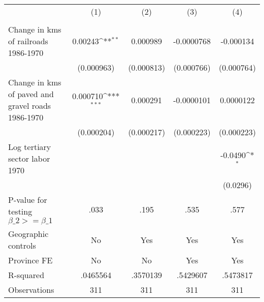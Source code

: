 {
\def\sym#1{\ifmmode^{#1}\else\(^{#1}\)\fi}
\begin{tabular}{l*{4}{c}}
\hline\hline
                &\multicolumn{1}{c}{(1)}&\multicolumn{1}{c}{(2)}&\multicolumn{1}{c}{(3)}&\multicolumn{1}{c}{(4)}\\
                &\multicolumn{1}{c}{}&\multicolumn{1}{c}{}&\multicolumn{1}{c}{}&\multicolumn{1}{c}{}\\
\hline
Change in kms of railroads 1986-1970&  0.00243\sym{**} & 0.000989         &-0.0000768         &-0.000134         \\
                &(0.000963)         &(0.000813)         &(0.000766)         &(0.000764)         \\
[1em]
Change in kms of paved and gravel roads 1986-1970& 0.000710\sym{***}& 0.000291         &-0.0000101         &0.0000122         \\
                &(0.000204)         &(0.000217)         &(0.000223)         &(0.000223)         \\
[1em]
Log tertiary sector labor 1970&                  &                  &                  &  -0.0490\sym{*}  \\
                &                  &                  &                  & (0.0296)         \\
\hline
P-value for testing $\beta\_{2} >= \beta\_{1}$&     .033         &     .195         &     .535         &     .577         \\
Geographic controls&       No         &      Yes         &      Yes         &      Yes         \\
Province FE     &       No         &       No         &      Yes         &      Yes         \\
R-squared       & .0465564         & .3570139         & .5429607         & .5473817         \\
Observations    &      311         &      311         &      311         &      311         \\
\hline\hline
\end{tabular}
}
